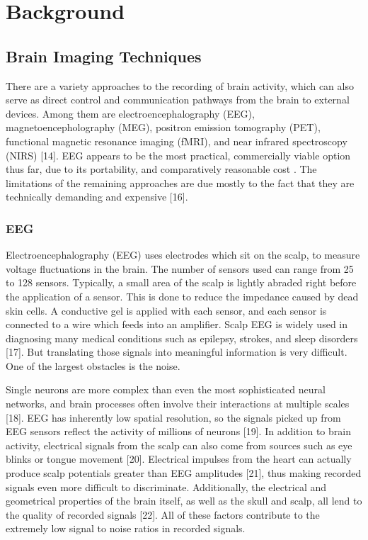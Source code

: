 \documentclass[12pt,titlepage]{article}
\begin{document}
\section{Background}

\subsection{Brain Imaging Techniques}

There are a variety approaches to the recording of brain activity, which can also serve as direct control 
and communication pathways from the brain to external devices.  Among them are 
electroencephalography (EEG), magnetoencepholography (MEG), positron emission tomography 
(PET), functional magnetic resonance imaging (fMRI), and near infrared spectroscopy (NIRS) [14].  EEG 
appears to be the most practical, commercially viable option thus far, due to its portability, and 
comparatively reasonable cost \cite{_next_little}.  The limitations of the remaining approaches are due mostly to the fact 
that they are technically demanding and expensive [16].

\subsubsection{EEG}

Electroencephalography (EEG) uses electrodes which sit on the scalp, to measure voltage fluctuations 
in the brain.  The number of sensors used can range from 25 to 128 sensors.  Typically, a small area of 
the scalp is lightly abraded right before the application of a sensor.  This is done to reduce the 
impedance caused by dead skin cells.  A conductive gel is applied with each sensor, and each sensor is 
connected to a wire which feeds into an amplifier.  Scalp EEG is widely used in diagnosing many 
medical conditions such as epilepsy, strokes, and sleep disorders [17].  But translating those signals into 
meaningful information is very difficult.  One of the largest obstacles is the noise.

Single neurons are more complex than even the most sophisticated neural networks, and brain 
processes often involve their interactions at multiple scales [18].   EEG has inherently low spatial 
resolution, so the signals picked up from EEG  sensors reflect the activity of millions of neurons [19].  In 
addition to brain activity, electrical signals from the scalp can also come from sources such as eye 
blinks or tongue movement [20].  Electrical impulses from the heart can actually produce scalp potentials 
greater than EEG amplitudes [21], thus making recorded signals even more difficult to discriminate. 
Additionally, the electrical and geometrical properties of the brain itself, as well as the skull and scalp, 
all lend to the quality of recorded signals [22].  All of these factors contribute to the extremely low signal 
to noise ratios in recorded signals.
\end{document}
